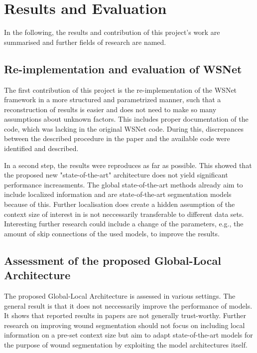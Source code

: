 \section{Results and Evaluation}

In the following, the results and contribution of this project's work are summarised and further fields of research are named.

\subsection{Re-implementation and evaluation of WSNet}

The first contribution of this project is the re-implementation of the WSNet framework in a more structured and parametrized manner, such that a reconstruction of results is easier and does not need to make so many assumptions about unknown factors. This includes proper documentation of the code, which was lacking in the original WSNet code. During this, discrepances between the described procedure in the paper and the available code were identified and described.

In a second step, the results were reproduces as far as possible. This showed that the proposed new "state-of-the-art" architecture does not yield significant performance increasments. The global state-of-the-art methods already aim to include localized information and are state-of-the-art segmentation models because of this. Further localisation does create a hidden assumption of the context size of interest in is not neccessarily transferable to different data sets. Interesting further research could include a change of the parameters, e.g., the amount of skip connections of the used models, to improve the results.

\subsection{Assessment of the proposed Global-Local Architecture}

The proposed Global-Local Architecture is assessed in various settings. The general result is that it does not neccessarily improve the performance of models. It shows that reported results in papers are not generally trust-worthy. Further research on improving wound segmentation should not focus on including local information on a pre-set context size but aim to adapt state-of-the-art models for the purpose of wound segmentation by exploiting the model architectures itself.

